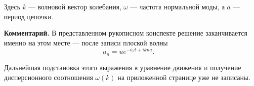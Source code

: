 \documentclass[../final.tex]{subfiles}
\begin{document}
Здесь $k$ --- волновой вектор колебания,
$\omega$ --- частота нормальной моды,
а $a$ --- период цепочки.

\textbf{Комментарий.}
В представленном рукописном конспекте решение заканчивается
именно на этом месте --- после записи плоской волны
%
\begin{equation*}
    u_n
    =
    u
    e^{-i\omega t+ikna}.
\end{equation*}

Дальнейшая подстановка этого выражения в уравнение движения
и получение дисперсионного соотношения $\omega(k)$ на
приложенной странице уже не записаны.
\end{document}
